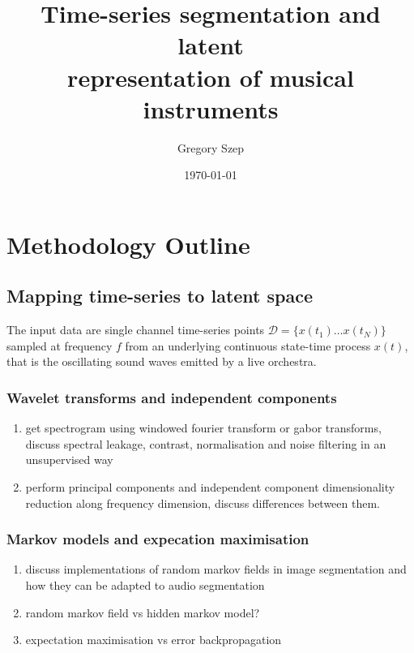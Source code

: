 \documentclass{article}[12pt]
\numberwithin{equation}{section}
\begin{document}
\title{
Time-series segmentation and latent\\ representation of musical instruments
}

\author{Gregory Szep}
\date{\today}
\maketitle

\section{Methodology Outline}
\subsection{Mapping time-series to latent space}
The input data are single channel time-series points $\mathcal{D}=\{x(t_1)\dots
x(t_N)\}$ sampled at frequency $f$ from an underlying continuous state-time
process $x(t)$, that is the oscillating sound waves emitted by a live orchestra.
\subsubsection{Wavelet transforms and independent components}
\begin{enumerate}
	\item get spectrogram using windowed fourier transform or gabor transforms,
	discuss spectral leakage, contrast, normalisation and noise filtering in an
	unsupervised way
	\item perform principal components and independent component dimensionality
	reduction along frequency dimension, discuss differences between them.
\end{enumerate}
\subsubsection{Markov models and expecation maximisation}
\begin{enumerate}
	\item discuss implementations of random markov fields in image segmentation
	and how they can be adapted to audio segmentation
	\item random markov field vs hidden markov model?
	\item expectation maximisation vs error backpropagation
\end{enumerate}
\end{document}
